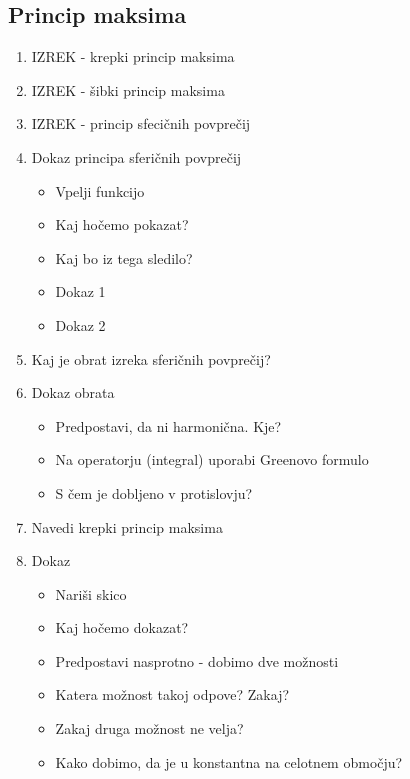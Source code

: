 \documentclass{article}
\begin{document}
    \subsection{Princip maksima}
    \begin{enumerate}
        \item IZREK - krepki princip maksima
        \item IZREK - šibki princip maksima
        \item IZREK - princip sfecičnih povprečij
        \item Dokaz principa sferičnih povprečij
        \begin{itemize}
            \item Vpelji funkcijo
            \item Kaj hočemo pokazat?
            \item Kaj bo iz tega sledilo?
            \item Dokaz 1
            \item Dokaz 2
        \end{itemize}
        \item Kaj je obrat izreka sferičnih povprečij?
        \item Dokaz obrata
        \begin{itemize}
            \item Predpostavi, da ni harmonična. Kje?
            \item Na operatorju (integral) uporabi Greenovo formulo
            \item S čem je dobljeno v protislovju?
        \end{itemize}
        \item Navedi krepki princip maksima
        \item Dokaz
        \begin{itemize}
            \item Nariši skico
            \item Kaj hočemo dokazat?
            \item Predpostavi nasprotno - dobimo dve možnosti
            \item Katera možnost takoj odpove? Zakaj?
            \item Zakaj druga možnost ne velja?
            \item Kako dobimo, da je u konstantna na celotnem območju?
        \end{itemize}
    \end{enumerate}
\end{document}
